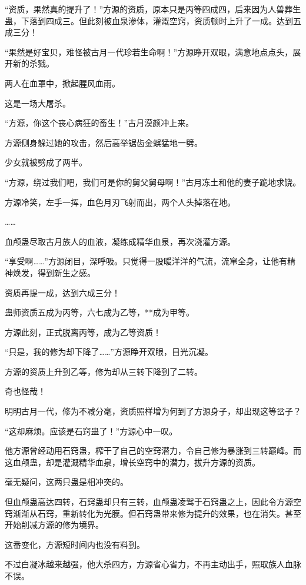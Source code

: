 \begin{this_body}
“资质，果然真的提升了！”方源的资质，原本只是丙等四成四，后来因为人兽葬生蛊，下落到四成三。但此刻被血泉渗体，灌溉空窍，资质顿时上升了一成。达到五成三分！

“果然是好宝贝，难怪被古月一代珍若生命啊！”方源睁开双眼，满意地点点头，展开新的杀戮。

两人在血罩中，掀起腥风血雨。

这是一场大屠杀。

“方源，你这个丧心病狂的畜生！”古月漠颜冲上来。

方源侧身躲过她的攻击，然后高举锯齿金蜈猛地一劈。

少女就被劈成了两半。

“方源，绕过我们吧，我们可是你的舅父舅母啊！”古月冻土和他的妻子跪地求饶。

方源冷笑，左手一挥，血色月刃飞射而出，两个人头掉落在地。

……

血颅蛊尽取古月族人的血液，凝练成精华血泉，再次浇灌方源。

“享受啊……”方源闭目，深呼吸。只觉得一股暖洋洋的气流，流窜全身，让他有精神焕发，得到新生之感。

资质再提一成，达到六成三分！

蛊师资质五成为丙等，六七成为乙等，**成为甲等。

方源此刻，正式脱离丙等，成为乙等资质！

“只是，我的修为却下降了……”方源睁开双眼，目光沉凝。

方源的资质上升到乙等，修为却从三转下降到了二转。

奇也怪哉！

明明古月一代，修为不减分毫，资质照样增为何到了方源身子，却出现这等岔子？

“这却麻烦。应该是石窍蛊了！”方源心中一叹。

他方源曾经动用石窍蛊，榨干了自己的空窍潜力，令自己修为暴涨到三转巅峰。而这血颅蛊，却是灌溉精华血泉，增长空窍中的潜力，拔升方源的资质。

毫无疑问，这两只蛊是相冲突的。

但血颅蛊高达四转，石窍蛊却只有三转，血颅蛊凌驾于石窍蛊之上，因此令方源空窍渐渐从石窍，重新转化为光膜。但石窍蛊带来修为提升的效果，也在消失。甚至开始削减方源的修为境界。

这番变化，方源短时间内也没有料到。

不过白凝冰越来越强，他大杀四方，方源省心省力，不再主动出手，照取族人血脉不误。


\end{this_body}
